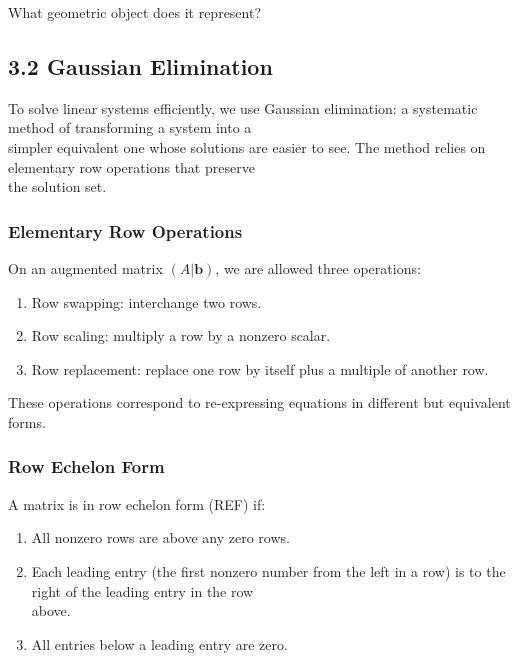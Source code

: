 \documentclass[
  12pt,
  a4paper,
]{article}
\begin{document}
What geometric object does it represent?

\subsection{3.2 Gaussian Elimination}\label{32-gaussian-elimination}

To solve linear systems efficiently, we use Gaussian elimination: a
systematic method of transforming a system into a\\
simpler equivalent one whose solutions are easier to see. The method
relies on elementary row operations that preserve\\
the solution set.

\subsubsection{Elementary Row
Operations}\label{elementary-row-operations}

On an augmented matrix \((A|\mathbf{b})\), we are allowed three
operations:

\begin{enumerate}
\def\labelenumi{\arabic{enumi}.}
\item
  Row swapping: interchange two rows.
\item
  Row scaling: multiply a row by a nonzero scalar.
\item
  Row replacement: replace one row by itself plus a multiple of another
  row.
\end{enumerate}

These operations correspond to re-expressing equations in different but
equivalent forms.

\subsubsection{Row Echelon Form}\label{row-echelon-form}

A matrix is in row echelon form (REF) if:

\begin{enumerate}
\def\labelenumi{\arabic{enumi}.}
\item
  All nonzero rows are above any zero rows.
\item
  Each leading entry (the first nonzero number from the left in a row)
  is to the right of the leading entry in the row\\
  above.
\item
  All entries below a leading entry are zero.
\end{enumerate}
\end{document}
